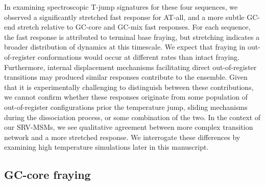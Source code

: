 \documentclass[journal=jpcbfk,manuscript=article]{achemso}
\begin{document}
In examining spectroscopic T-jump signatures for these four sequences, we observed a significantly stretched fast response for AT-all, and a more subtle GC-end stretch relative to GC-core and GC-mix fast responses. For each sequence, the fast response is attributed to terminal base fraying, but stretching indicates a broader distribution of dynamics at this timescale. We expect that fraying in out-of-register conformations would occur at different rates than intact fraying. Furthermore, internal displacement mechanisms facilitating direct out-of-register transitions may produced similar responses contribute to the ensemble. Given that it is experimentally challenging to distinguish between these contributions, we cannot confirm whether these responses originate from some population of out-of-register configurations prior the temperature jump, sliding mechanisms during the dissociation process, or some combination of the two. In the context of our SRV-MSMs, we see qualitative agreement between more complex transition network and a more stretched response. We interrogate these differences by examining high temperature simulations later in this manuscript.



\subsection{GC-core fraying} %
\end{document}
